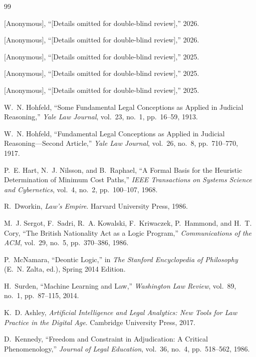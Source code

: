 \documentclass[12pt]{article}
\theoremstyle{definition}
\theoremstyle{remark}
\begin{document}
\begin{thebibliography}{99}

[Anonymous], ``[Details omitted for double-blind review],'' 2026.

[Anonymous], ``[Details omitted for double-blind review],'' 2026.

[Anonymous], ``[Details omitted for double-blind review],'' 2025.

[Anonymous], ``[Details omitted for double-blind review],'' 2025.

[Anonymous], ``[Details omitted for double-blind review],'' 2025.

W.~N. Hohfeld, ``Some Fundamental Legal Conceptions as Applied in Judicial Reasoning,'' \emph{Yale Law Journal}, vol.~23, no.~1, pp.~16--59, 1913.

W.~N. Hohfeld, ``Fundamental Legal Conceptions as Applied in Judicial Reasoning---Second Article,'' \emph{Yale Law Journal}, vol.~26, no.~8, pp.~710--770, 1917.

P.~E. Hart, N.~J. Nilsson, and B.~Raphael, ``A Formal Basis for the Heuristic Determination of Minimum Cost Paths,'' \emph{IEEE Transactions on Systems Science and Cybernetics}, vol.~4, no.~2, pp.~100--107, 1968.

R.~Dworkin, \emph{Law's Empire}. Harvard University Press, 1986.

M.~J. Sergot, F.~Sadri, R.~A. Kowalski, F.~Kriwaczek, P.~Hammond, and H.~T. Cory, ``The British Nationality Act as a Logic Program,'' \emph{Communications of the ACM}, vol.~29, no.~5, pp.~370--386, 1986.

P.~McNamara, ``Deontic Logic,'' in \emph{The Stanford Encyclopedia of Philosophy} (E.~N. Zalta, ed.), Spring 2014 Edition.

H.~Surden, ``Machine Learning and Law,'' \emph{Washington Law Review}, vol.~89, no.~1, pp.~87--115, 2014.

K.~D. Ashley, \emph{Artificial Intelligence and Legal Analytics: New Tools for Law Practice in the Digital Age}. Cambridge University Press, 2017.

D.~Kennedy, ``Freedom and Constraint in Adjudication: A Critical Phenomenology,'' \emph{Journal of Legal Education}, vol.~36, no.~4, pp.~518--562, 1986.


\end{thebibliography}
\end{document}

